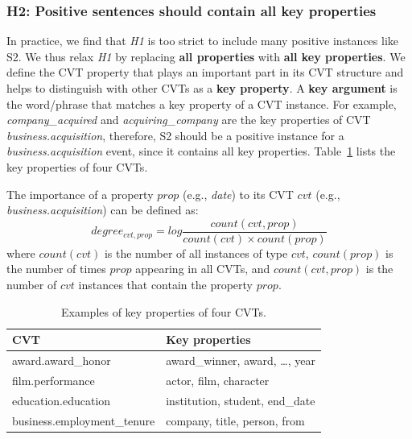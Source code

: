
\subsubsection{H2: Positive sentences should contain all key properties}
In practice, we find that \emph{H1} is too strict to include many positive instances like S2. 
We thus relax \emph{H1} by replacing \textbf{all properties} with \textbf{all key properties}. We define the CVT property that plays an important part in its CVT structure and helps to distinguish with other CVTs as a \textbf{key property}. A \textbf{key argument} is the word/phrase that matches a key property of a CVT instance. For example, \emph{company\_acquired} and \emph{acquiring\_company} are the key properties of CVT \emph{business.acquisition}, therefore,  S2 should be a positive instance for a \emph{business.acquisition} event, since it contains all key properties. Table~\ref{tab:5} lists the key properties of four CVTs.

The importance of a property $prop$ (e.g., \emph{date}) to its CVT $cvt$ (e.g., \emph{business.acquisition}) can be defined as:
\begin{equation}
	degree_{cvt, prop} = log \frac{count(cvt, prop)}{count(cvt) \times count(prop)} 
\end{equation}
where $count(cvt)$ is the number of all instances of type $cvt$, $count(prop)$ is the number of times $prop$ appearing in all CVTs, and $count(cvt, prop)$ is the number of $cvt$ instances that contain the property $prop$.

\begin{table}
\centering
\small
\begin{tabular}{|l|l|} \hline
CVT & Key properties \\ \hline
award.award\_honor & award\_winner, award, \ldots, year \\ \hline
film.performance & actor, film, character \\ \hline
education.education & institution, student, end\_date \\ \hline
business.employment\_tenure & company, title, person, from \\ \hline
\end{tabular}
\caption{Examples of key properties of four CVTs.\label{tab:5}}
\end{table}

